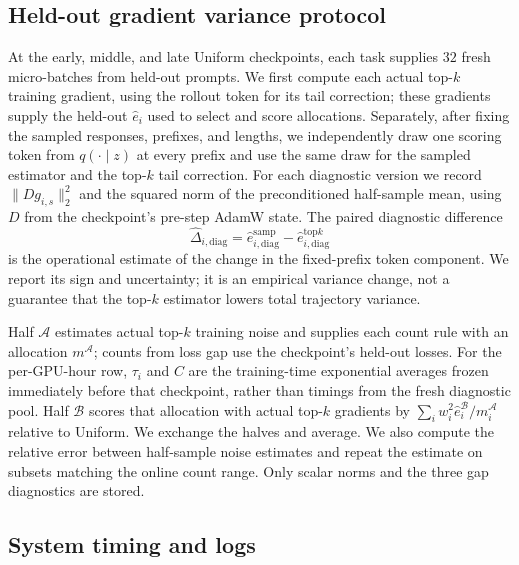 \subsection{Held-out gradient variance protocol}
\label{app:heldout}

At the early, middle, and late Uniform checkpoints, each task supplies $32$
fresh micro-batches from held-out prompts. We first compute each actual top-$k$
training gradient, using the rollout token for its tail correction; these
gradients supply the held-out $\widehat e_i$ used to select and score
allocations. Separately, after fixing the sampled responses, prefixes, and
lengths, we independently draw one scoring token from $q(\cdot\mid z)$ at every
prefix and use the same draw for the sampled estimator and the top-$k$ tail
correction. For each diagnostic version we record
$\|Dg_{i,s}\|_2^2$ and the squared norm of the preconditioned half-sample mean,
using $D$ from the checkpoint's pre-step AdamW state. The paired diagnostic
difference
\begin{equation}
    \widehat\Delta_{i,\mathrm{diag}}
      =\widehat e_{i,\mathrm{diag}}^{\mathrm{samp}}
       -\widehat e_{i,\mathrm{diag}}^{\mathrm{top}k}
\end{equation}
is the operational estimate of the change in the fixed-prefix token component.
We report its sign and uncertainty; it is an empirical variance change, not a
guarantee that the top-$k$ estimator lowers total trajectory variance.

Half $\mathcal A$ estimates actual top-$k$ training noise and supplies each count rule with an
allocation $m^{\mathcal A}$; counts from loss gap use the checkpoint's held-out
losses. For the per-GPU-hour row, $\tau_i$ and $C$ are the training-time
exponential averages frozen immediately before that checkpoint, rather than
timings from the fresh diagnostic pool. Half $\mathcal B$ scores that allocation
with actual top-$k$ gradients by
$\sum_iw_i^2\widehat e_i^{\mathcal B}/m_i^{\mathcal A}$ relative to Uniform.
We exchange the halves and average. We also compute the relative error between
half-sample noise estimates and repeat the estimate on subsets matching the
online count range. Only scalar norms and the three gap diagnostics are stored.

\subsection{System timing and logs}
\label{app:system_details}

